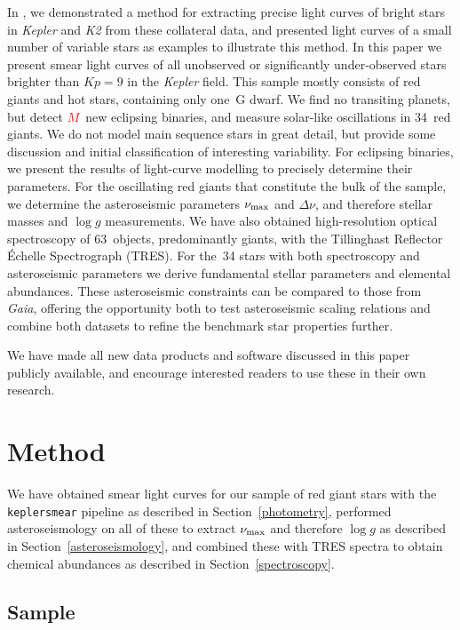 \documentclass[a4paper,fleqn,usenatbib]{mnras}
\newcommand{\numax}{\mbox{$\nu_{\rm max}$}\xspace}
\newcommand{\Dnu}{\mbox{$\Delta \nu$}\xspace}
\newcommand{\logg}{\mbox{$\log g$}\xspace}
\newcommand{\kepler}{\emph{Kepler}\xspace}
\newcommand{\ktwo}{\emph{K2}\xspace}
\newcommand{\gaia}{\emph{Gaia}\xspace}
\begin{document}
In \citet{smear}, we demonstrated a method for extracting precise light curves of bright stars in \kepler and \ktwo from these collateral data, and presented light curves of a small number of variable stars as examples to illustrate this method. In this paper we present smear light curves of all unobserved or significantly under-observed stars brighter than $Kp=9$ in the \kepler field. This sample mostly consists of red giants and hot stars, containing only one~G dwarf. We find no transiting planets, but detect \textcolor{red}{$M$}~new eclipsing binaries, and measure solar-like oscillations in 34~red giants. We do not model main sequence stars in great detail, but provide some discussion and initial classification of interesting variability. For eclipsing binaries, we present the results of light-curve modelling to precisely determine their parameters. For the oscillating red giants that constitute the bulk of the sample, we determine the asteroseismic parameters \numax and \Dnu, and therefore stellar masses and \logg measurements. We have also obtained high-resolution optical spectroscopy of 63~objects, predominantly giants, with the Tillinghast Reflector \'{E}chelle Spectrograph (TRES). For the~34 stars with both spectroscopy and asteroseismic parameters we derive fundamental stellar parameters and elemental abundances. These asteroseismic constraints can be compared to those from \gaia, offering the opportunity both to test asteroseismic scaling relations and combine both datasets to refine the benchmark star properties further.

We have made all new data products and software discussed in this paper publicly available, and encourage interested readers to use these in their own research.   

\section{Method}
\label{method}

We have obtained smear light curves for our sample of red giant stars with the \texttt{keplersmear} pipeline as described in Section~\ref{photometry}, performed asteroseismology on all of these to extract \numax and therefore \logg as described in Section~\ref{asteroseismology}, and combined these with TRES spectra to obtain chemical abundances as described in Section~\ref{spectroscopy}. 

\subsection{Sample}
\label{sample}
\end{document}
